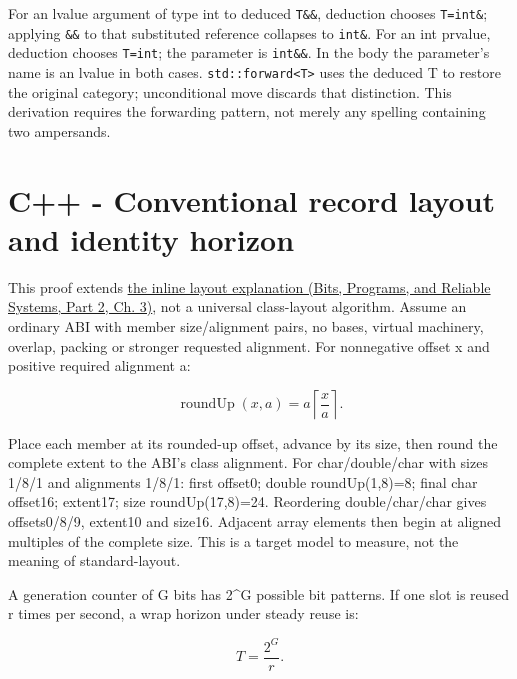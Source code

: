 \hypertarget{03-visual-computing-i-ch018-forwarding-reconstructed-from-collapsing}{}

For an lvalue argument of type int to deduced \texttt{T\&\&}, deduction chooses \texttt{T=int\&}; applying \texttt{\&\&} to that substituted reference collapses to \texttt{int\&}. For an int prvalue, deduction chooses \texttt{T=int}; the parameter is \texttt{int\&\&}. In the body the parameter's name is an lvalue in both cases. \texttt{std::forward\textless{}T\textgreater{}} uses the deduced T to restore the original category; unconditional move discards that distinction. This derivation requires the forwarding pattern, not merely any spelling containing two ampersands.

\section{C++ - Conventional record layout and identity horizon}\label{03-visual-computing-i-ch018-c---conventional-record-layout-and-identity-horizon}

\hypertarget{03-visual-computing-i-ch018-c---conventional-record-layout-and-identity-horizon}{}

This proof extends \href{../01-Bits-Programs-and-Reliable-Systems-P02/main.pdf\#nameddest=01-foundations-i-ch003-bringing-the-object-model-back-to-bytes}{the inline layout explanation (Bits, Programs, and Reliable Systems, Part 2, Ch. 3)}, not a universal class-layout algorithm. Assume an ordinary ABI with member size/alignment pairs, no bases, virtual machinery, overlap, packing or stronger requested alignment. For nonnegative offset x and positive required alignment a:

\[
\operatorname{roundUp}(x,a)=a\left\lceil\frac{x}{a}\right\rceil.
\]

Place each member at its rounded-up offset, advance by its size, then round the complete extent to the ABI's class alignment. For char/double/char with sizes 1/8/1 and alignments 1/8/1: first offset0; double roundUp(1,8)=8; final char offset16; extent17; size roundUp(17,8)=24. Reordering double/char/char gives offsets0/8/9, extent10 and size16. Adjacent array elements then begin at aligned multiples of the complete size. This is a target model to measure, not the meaning of standard-layout.

A generation counter of G bits has 2\^{}G possible bit patterns. If one slot is reused r times per second, a wrap horizon under steady reuse is:

\[
T=\frac{2^G}{r}.
\]

